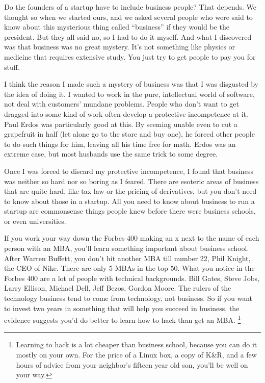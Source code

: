 \documentclass[12pt]{book}
\begin{document}
Do the founders of a startup have to include business people? That
depends. We thought so when we started ours, and we asked several people
who were said to know about this mysterious thing called ``business'' if
they would be the president. But they all said no, so I had to do it
myself. And what I discovered was that business was no great mystery.
It's not something like physics or medicine that requires extensive
study. You just try to get people to pay you for stuff.

I think the reason I made such a mystery of business was that I was
disgusted by the idea of doing it. I wanted to work in the pure,
intellectual world of software, not deal with customers' mundane
problems. People who don't want to get dragged into some kind of work
often develop a protective incompetence at it. Paul Erdos was
particularly good at this. By seeming unable even to cut a grapefruit in
half (let alone go to the store and buy one), he forced other people to
do such things for him, leaving all his time free for math. Erdos was an
extreme case, but most husbands use the same trick to some degree.

Once I was forced to discard my protective incompetence, I found that
business was neither so hard nor so boring as I feared. There are
esoteric areas of business that are quite hard, like tax law or the
pricing of derivatives, but you don't need to know about those in a
startup. All you need to know about business to run a startup are
commonsense things people knew before there were business schools, or
even universities.

If you work your way down the Forbes 400 making an x next to the name of
each person with an MBA, you'll learn something important about business
school. After Warren Buffett, you don't hit another MBA till number 22,
Phil Knight, the CEO of Nike. There are only 5 MBAs in the top 50. What
you notice in the Forbes 400 are a lot of people with technical
backgrounds. Bill Gates, Steve Jobs, Larry Ellison, Michael Dell, Jeff
Bezos, Gordon Moore. The rulers of the technology business tend to come
from technology, not business. So if you want to invest two years in
something that will help you succeed in business, the evidence suggests
you'd do better to learn how to hack than get an MBA. \footnote{Learning to hack is a lot cheaper than business school, because
you can do it mostly on your own. For the price of a Linux box, a copy
of K\&R, and a few hours of advice from your neighbor's fifteen year old
son, you'll be well on your way.}
\end{document}
